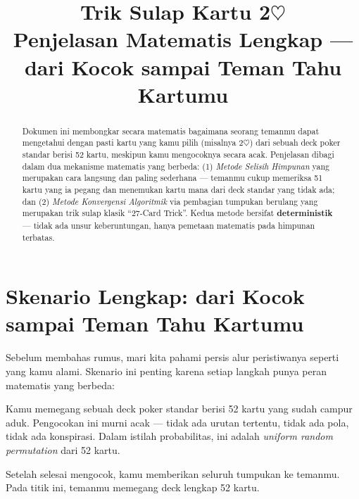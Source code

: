 \documentclass[11pt,a4paper]{article}
\title{\bfseries\LARGE Trik Sulap Kartu 2$\heartsuit$ \\[0.3em]
       \large Penjelasan Matematis Lengkap --- dari Kocok sampai Teman Tahu Kartumu}
\author{}
\date{}
\theoremstyle{definition}
\begin{document}
\maketitle
\thispagestyle{empty}

\begin{abstract}
\noindent
Dokumen ini membongkar secara matematis bagaimana seorang temanmu dapat mengetahui dengan pasti kartu yang kamu pilih (misalnya 2$\heartsuit$) dari sebuah deck poker standar berisi 52 kartu, meskipun kamu mengocoknya secara acak. Penjelasan dibagi dalam dua mekanisme matematis yang berbeda: (1) \emph{Metode Selisih Himpunan} yang merupakan cara langsung dan paling sederhana --- temanmu cukup memeriksa 51 kartu yang ia pegang dan menemukan kartu mana dari deck standar yang tidak ada; dan (2) \emph{Metode Konvergensi Algoritmik} via pembagian tumpukan berulang yang merupakan trik sulap klasik ``27-Card Trick''. Kedua metode bersifat \textbf{deterministik} --- tidak ada unsur keberuntungan, hanya pemetaan matematis pada himpunan terbatas.
\end{abstract}

\vspace{0.5em}

\tableofcontents
\newpage

\section{Skenario Lengkap: dari Kocok sampai Teman Tahu Kartumu}

Sebelum membahas rumus, mari kita pahami persis alur peristiwanya seperti yang kamu alami. Skenario ini penting karena setiap langkah punya peran matematis yang berbeda:

\begin{tahapbox}
Kamu memegang sebuah deck poker standar berisi 52 kartu yang sudah campur aduk. Pengocokan ini murni acak --- tidak ada urutan tertentu, tidak ada pola, tidak ada konspirasi. Dalam istilah probabilitas, ini adalah \emph{uniform random permutation} dari 52 kartu.
\end{tahapbox}

\begin{tahapbox}
Setelah selesai mengocok, kamu memberikan seluruh tumpukan ke temanmu. Pada titik ini, temanmu memegang deck lengkap 52 kartu.
\end{tahapbox}
\end{document}

